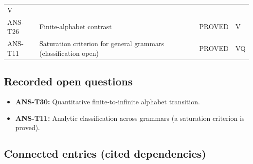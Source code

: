 \documentclass[
  11pt,
]{article}
\providecommand{\tightlist}{%
  \setlength{\itemsep}{0pt}\setlength{\parskip}{0pt}}
\begin{document}
\begin{longtable}[]{@{}llll@{}}
\begin{minipage}[t]{0.10\columnwidth}
V\strut
\end{minipage}\tabularnewline
\begin{minipage}[t]{0.16\columnwidth}\raggedright
ANS-T26\strut
\end{minipage} & \begin{minipage}[t]{0.41\columnwidth}\raggedright
Finite-alphabet contrast\strut
\end{minipage} & \begin{minipage}[t]{0.22\columnwidth}\raggedright
PROVED\strut
\end{minipage} & \begin{minipage}[t]{0.10\columnwidth}\raggedright
V\strut
\end{minipage}\tabularnewline
\begin{minipage}[t]{0.16\columnwidth}\raggedright
ANS-T11\strut
\end{minipage} & \begin{minipage}[t]{0.41\columnwidth}\raggedright
Saturation criterion for general grammars (classification open)\strut
\end{minipage} & \begin{minipage}[t]{0.22\columnwidth}\raggedright
PROVED\strut
\end{minipage} & \begin{minipage}[t]{0.10\columnwidth}\raggedright
VQ\strut
\end{minipage}\tabularnewline
\bottomrule
\end{longtable}

\hypertarget{recorded-open-questions-1}{%
\subsection{Recorded open questions}\label{recorded-open-questions-1}}

\begin{itemize}
\tightlist
\item
  \textbf{ANS-T30:} Quantitative finite-to-infinite alphabet transition.
\item
  \textbf{ANS-T11:} Analytic classification across grammars (a
  saturation criterion is proved).
\end{itemize}

\hypertarget{connected-entries-cited-dependencies-1}{%
\subsection{Connected entries (cited
dependencies)}\label{connected-entries-cited-dependencies-1}}
\end{document}
